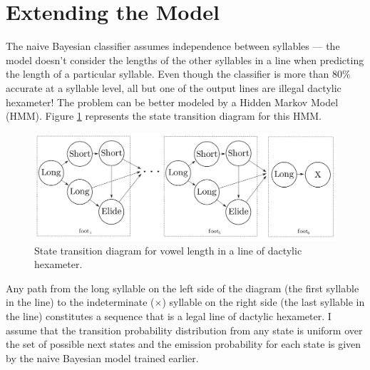 \documentclass[12pt]{article}
\begin{document}
\section*{Extending the Model}
The naive Bayesian classifier assumes independence between syllables --- the model doesn't consider the lengths of the other syllables in a line when predicting the length of a particular syllable. Even though the classifier is more than 80\% accurate at a syllable level, all but one of the output lines are illegal dactylic hexameter! The problem can be better modeled by a Hidden Markov Model (HMM). Figure \ref{fig:state_transition} represents the state transition diagram for this HMM. 

\begin{figure}[htb]
\begin{center}
\includegraphics[width=13.5cm]{../figs/graph.png}
\caption{State transition diagram for vowel length in a line of dactylic hexameter.}
\label{fig:state_transition}
\end{center}
\end{figure}

Any path from the long syllable on the left side of the diagram (the first syllable in the line) to the indeterminate ($\times$) syllable on the right side (the last syllable in the line) constitutes a sequence that is a legal line of dactylic hexameter. I assume that the transition probability distribution from any state is uniform over the set of possible next states and the emission probability for each state is given by the naive Bayesian model trained earlier.
\end{document}
